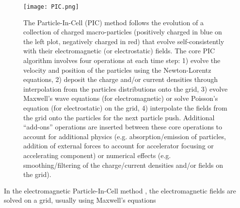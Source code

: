 \documentclass[]{report}
\begin{document}
\begin{figure}
\texttt{[image: PIC.png]}
\caption{\label{fig:PIC} The Particle-In-Cell (PIC) method follows the evolution of a collection of charged macro-particles (positively charged in blue on the left plot, negatively charged in red) that evolve self-consistently with their electromagnetic (or electrostatic) fields. The core PIC algorithm involves four operations at each time step: 1) evolve the velocity and position of the particles using the Newton-Lorentz equations, 2) deposit the charge and/or current densities through interpolation from the particles distributions onto the grid, 3) evolve Maxwell's wave equations (for electromagnetic) or solve Poisson's equation (for electrostatic) on the grid, 4) interpolate the fields from the grid onto the particles for the next particle push. Additional ``add-ons'' operations are inserted between these core operations to account for additional physics (e.g. absorption/emission of particles, addition of external forces to account for accelerator focusing or accelerating component) or numerical effects (e.g. smoothing/filtering of the charge/current densities and/or fields on the grid).}
\end{figure}

In the electromagnetic Particle-In-Cell method \cite{Birdsalllangdon},
the electromagnetic fields are solved on a grid, usually using Maxwell's
equations
\end{document}
